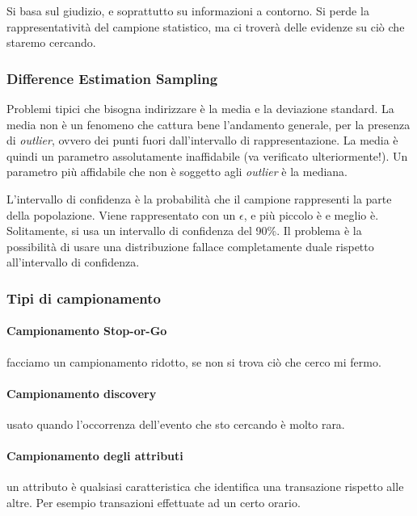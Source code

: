 

Si basa sul giudizio, e soprattutto su informazioni a contorno. Si perde la
rappresentatività del campione statistico, ma ci troverà delle evidenze su ciò
che staremo cercando.

\subsubsection{Difference Estimation Sampling}

Problemi tipici che bisogna indirizzare è la media e la deviazione standard.
La media non è un fenomeno che cattura bene l'andamento generale, per la
presenza di \textit{outlier}, ovvero dei punti fuori dall'intervallo di
rappresentazione. %
La media è quindi un parametro assolutamente inaffidabile (va verificato
ulteriormente!). Un parametro più affidabile che non è soggetto agli
\textit{outlier} è la mediana.

L'intervallo di confidenza è la probabilità che il campione rappresenti la parte
della popolazione. Viene rappresentato con un $\epsilon$, e più piccolo è e
meglio è. Solitamente, si usa un intervallo di confidenza del 90\%. Il problema
è la possibilità di usare una distribuzione fallace completamente duale rispetto
all'intervallo di confidenza.


\subsubsection{Tipi di campionamento}

\paragraph*{Campionamento Stop-or-Go} facciamo un campionamento ridotto, se non
si trova ciò che cerco mi fermo.

\paragraph*{Campionamento discovery} usato quando l'occorrenza dell'evento che
sto cercando è molto rara.

\paragraph*{Campionamento degli attributi} un attributo è qualsiasi
caratteristica che identifica una transazione rispetto alle altre. Per esempio
transazioni effettuate ad un certo orario.


